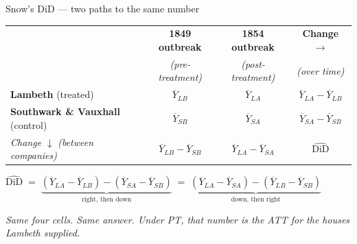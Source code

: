 \documentclass[aspectratio=169,11pt]{beamer}
\begin{document}
\begin{frame}{Snow's DiD --- two paths to the same number}
\vspace{0.3em}
\begin{center}
\renewcommand{\arraystretch}{1.45}
\begin{tabular}{@{}lcc|c@{}}
\toprule
& \textbf{1849 outbreak} & \textbf{1854 outbreak} & \textbf{Change $\rightarrow$} \\
& \textit{(pre-treatment)} & \textit{(post-treatment)} & \textit{(over time)} \\
\midrule
\textbf{\color{accent}Lambeth} (treated)               & $\overline{Y}_{LB}$ & $\overline{Y}_{LA}$ & $\overline{Y}_{LA} - \overline{Y}_{LB}$ \\
\textbf{\color{slate}Southwark \& Vauxhall} (control)  & $\overline{Y}_{SB}$ & $\overline{Y}_{SA}$ & $\overline{Y}_{SA} - \overline{Y}_{SB}$ \\
\midrule
\textit{Change} $\downarrow$ \textit{(between companies)} & $\overline{Y}_{LB} - \overline{Y}_{SB}$ & $\overline{Y}_{LA} - \overline{Y}_{SA}$ & {\setlength{\fboxsep}{5pt}\colorbox{remixgreenlight}{\textbf{\color{charcoal}$\widehat{\text{DiD}}$}}} \\
\bottomrule
\end{tabular}
\end{center}
\vspace{0.4em}
\begin{center}
\small
$\widehat{\text{DiD}}\;=\;\underbrace{(\overline{Y}_{LA} - \overline{Y}_{LB}) - (\overline{Y}_{SA} - \overline{Y}_{SB})}_{\text{right, then down}}\;=\;\underbrace{(\overline{Y}_{LA} - \overline{Y}_{SA}) - (\overline{Y}_{LB} - \overline{Y}_{SB})}_{\text{down, then right}}$
\end{center}
\vspace{0.2em}
\begin{center}
\small\color{warmgray}\itshape Same four cells. Same answer. Under PT, that number is the ATT for the houses Lambeth supplied.
\end{center}
\end{frame}
\end{document}
